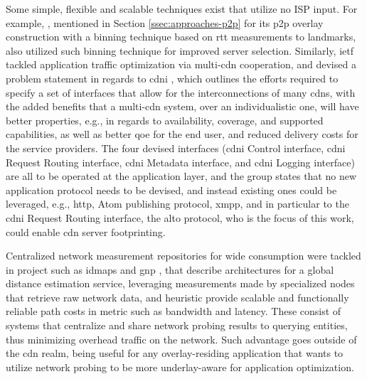     Some simple, flexible and scalable techniques exist that utilize no ISP input.
    For example, \cite{topology-aware-p2p-server-selection}, mentioned in Section \ref{ssec:approaches-p2p} for its \gls{p2p} overlay construction with a binning technique based on \gls{rtt} measurements to landmarks, also utilized such binning technique for improved server selection.
    Similarly, \gls{ietf} tackled application traffic optimization via multi-\gls{cdn} cooperation, and devised a problem statement in regards to \gls{cdni} \cite{cdni-problem-statement}, which outlines the efforts required to specify a set of interfaces that allow for the interconnections of many \glspl{cdn}, with the added benefits that a multi-\gls{cdn} system, over an individualistic one, will have better properties, e.g., in regards to availability, coverage, and supported capabilities, as well as better \gls{qoe} for the end user, and reduced delivery costs for the service providers.
    The four devised interfaces (\gls{cdni} Control interface, \gls{cdni} Request Routing interface, \gls{cdni} Metadata interface, and \gls{cdni} Logging interface) are all to be operated at the application layer, and the group states that no new application protocol needs to be devised, and instead existing ones could be leveraged, e.g., \gls{http}, Atom publishing protocol, \gls{xmpp}, and in particular to the \gls{cdni} Request Routing interface, the \gls{alto} protocol, who is the focus of this work, could enable \gls{cdn} server footprinting.

    Centralized network measurement repositories for wide consumption were tackled in project such as \gls{idmaps} \cite{idmaps} and \gls{gnp} \cite{gnp}, that describe architectures for a global distance estimation service, leveraging measurements made by specialized nodes that retrieve raw network data, and heuristic provide scalable and functionally reliable path costs in metric such as bandwidth and latency.
    These consist of systems that centralize and share network probing results to querying entities, thus minimizing overhead traffic on the network.
    Such advantage goes outside of the \gls{cdn} realm, being useful for any overlay-residing application that wants to utilize network probing to be more underlay-aware for application optimization.

